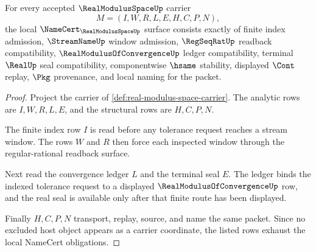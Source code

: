 \begin{theorem}
\label{thm:real-modulus-space-namecert-obligations}
For every accepted $\RealModulusSpaceUp$ carrier
$$
M=(I,W,R,L,E,H,C,P,N),
$$
the local $\NameCert_{\RealModulusSpaceUp}$ surface consists exactly of finite
index admission, $\StreamNameUp$ window admission, $\RegSeqRatUp$ readback
compatibility, $\RealModulusOfConvergenceUp$ ledger compatibility, terminal
$\RealUp$ seal compatibility, componentwise $\hsame$ stability, displayed
$\Cont$ replay, $\Pkg$ provenance, and local naming for the packet.
\end{theorem}
\begin{proof}
Project the carrier of \autoref{def:real-modulus-space-carrier}. The analytic
rows are $I,W,R,L,E$, and the structural rows are $H,C,P,N$.

The finite index row $I$ is read before any tolerance request reaches a stream
window. The rows $W$ and $R$ then force each inspected window through the
regular-rational readback surface.

Next read the convergence ledger $L$ and the terminal seal $E$. The ledger binds
the indexed tolerance request to a displayed $\RealModulusOfConvergenceUp$ row,
and the real seal is available only after that finite route has been displayed.

Finally $H,C,P,N$ transport, replay, source, and name the same packet. Since no
excluded host object appears as a carrier coordinate, the listed rows exhaust
the local NameCert obligations.
\end{proof}

